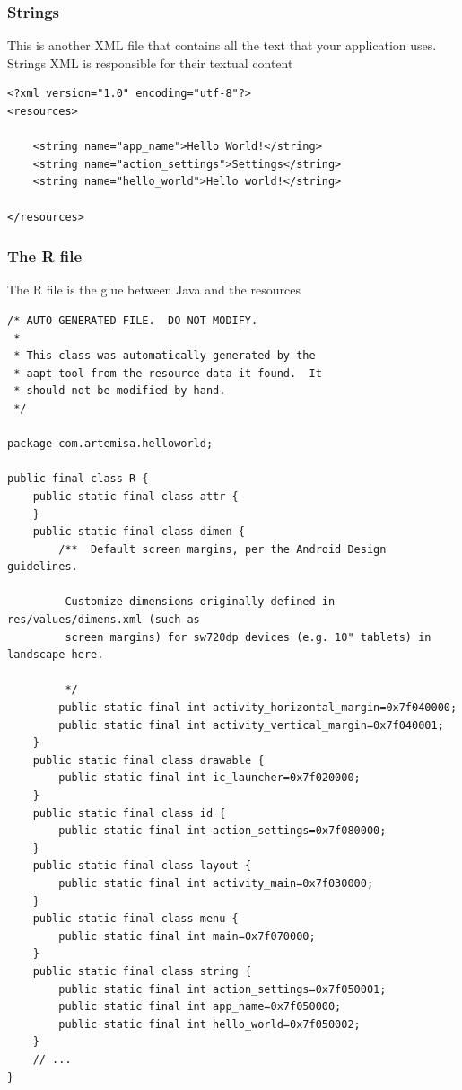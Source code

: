 \begin{frame}[fragile]
\frametitle{Strings}
This is another XML file that contains all the text that your application uses. Strings XML is responsible for their textual content
\lstset{language=XML, style=eclipse}
\begin{adjustbox}{width=1.0 \textwidth}
\begin{lstlisting}[caption=res/values/strings.xml]
<?xml version="1.0" encoding="utf-8"?>
<resources>

    <string name="app_name">Hello World!</string>
    <string name="action_settings">Settings</string>
    <string name="hello_world">Hello world!</string>

</resources>
\end{lstlisting}
\end{adjustbox}
\end{frame}
\begin{frame}[fragile]
\frametitle{The R file}
The R file is the glue between Java and the resources
\lstset{language=java, style=eclipse, tabsize=2}
\begin{adjustbox}{width=0.5 \textwidth}
\begin{lstlisting}[caption=gen/artemisa/helloworld/R.java]
/* AUTO-GENERATED FILE.  DO NOT MODIFY.
 *
 * This class was automatically generated by the
 * aapt tool from the resource data it found.  It
 * should not be modified by hand.
 */

package com.artemisa.helloworld;

public final class R {
    public static final class attr {
    }
    public static final class dimen {
        /**  Default screen margins, per the Android Design guidelines. 

         Customize dimensions originally defined in res/values/dimens.xml (such as
         screen margins) for sw720dp devices (e.g. 10" tablets) in landscape here.
    
         */
        public static final int activity_horizontal_margin=0x7f040000;
        public static final int activity_vertical_margin=0x7f040001;
    }
    public static final class drawable {
        public static final int ic_launcher=0x7f020000;
    }
    public static final class id {
        public static final int action_settings=0x7f080000;
    }
    public static final class layout {
        public static final int activity_main=0x7f030000;
    }
    public static final class menu {
        public static final int main=0x7f070000;
    }
    public static final class string {
        public static final int action_settings=0x7f050001;
        public static final int app_name=0x7f050000;
        public static final int hello_world=0x7f050002;
    }
    // ...
}
\end{lstlisting}
\end{adjustbox}
\end{frame}
